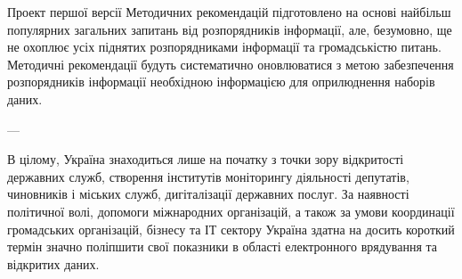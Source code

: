 Проект першої версії Методичних рекомендацій підготовлено на основі найбільш популярних загальних запитань від розпорядників інформації, але, безумовно, ще не охоплює усіх піднятих розпорядниками інформації та громадськістю питань. Методичні рекомендації будуть систематично оновлюватися з метою забезпечення розпорядників інформації необхідною інформацією для оприлюднення наборів даних.

---

В цілому, Україна знаходиться лише на початку з точки зору відкритості державних служб, створення інститутів моніторингу діяльності депутатів, чиновників і міських служб, дигіталізації державних послуг. За наявності політичної волі, допомоги міжнародних організацій, а також за умови координації громадських організацій, бізнесу та ІТ сектору Україна здатна на досить короткий термін значно поліпшити свої показники в області електронного врядування та відкритих даних.
